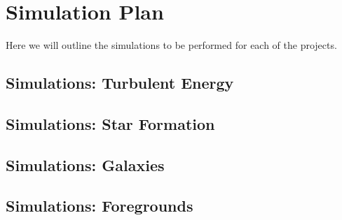 \section{Simulation Plan}

Here we will outline the simulations to be performed for each of the projects.

\subsection{Simulations: Turbulent Energy}
\label{sec.sims_turb}


\subsection{Simulations: Star Formation}
\label{sec.sims_cores}


\subsection{Simulations: Galaxies}
\label{sec.sims_galaxies}


\subsection{Simulations: Foregrounds}
\label{sec.sims_cmb}

